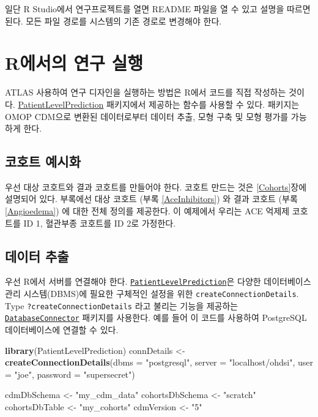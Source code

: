 \documentclass[11pt]{book}
\newenvironment{Shaded}{\begin{snugshade}}{\end{snugshade}}
\newcommand{\KeywordTok}[1]{\textcolor[rgb]{0.13,0.29,0.53}{\textbf{#1}}}
\newcommand{\DataTypeTok}[1]{\textcolor[rgb]{0.13,0.29,0.53}{#1}}
\newcommand{\StringTok}[1]{\textcolor[rgb]{0.31,0.60,0.02}{#1}}
\newcommand{\NormalTok}[1]{#1}
\theoremstyle{definition}
\theoremstyle{definition}
\theoremstyle{definition}
\theoremstyle{remark}
\begin{document}
일단 R Studio에서 연구프로젝트를 열면 README 파일을 열 수 있고 설명을
따르면 된다. 모든 파일 경로를 시스템의 기존 경로로 변경해야 한다.

\section{R에서의 연구 실행}\label{r--}

ATLAS 사용하여 연구 디자인을 실행하는 방법은 R에서 코드를 직접 작성하는
것이다.
\href{https://ohdsi.github.io/PatientLevelPrediction/}{PatientLevelPrediction}
패키지에서 제공하는 함수를 사용할 수 있다. 패키지는 OMOP CDM으로 변환된
데이터로부터 데이터 추출, 모형 구축 및 모형 평가를 가능하게 한다.

\subsection{코호트 예시화}\label{-}

우선 대상 코호트와 결과 코호트를 만들어야 한다. 코호트 만드는 것은
\ref{Cohorts}장에 설명되어 있다. 부록에선 대상 코호트 (부록
\ref{AceInhibitors}) 와 결과 코호트 (부록 \ref{Angioedema}) 에 대한 전체
정의를 제공한다. 이 예제에서 우리는 ACE 억제제 코호트를 ID 1, 혈관부종
코호트를 ID 2로 가정한다.

\subsection{데이터 추출}\label{--2}

우선 R에서 서버를 연결해야 한다.
\href{https://ohdsi.github.io/PatientLevelPrediction/}{\texttt{PatientLevelPrediction}}은
다양한 데이터베이스 관리 시스템(DBMS)에 필요한 구체적인 설정을 위한
\texttt{createConnectionDetails}. Type \texttt{?createConnectionDetails}
라고 불리는 기능을 제공하는
\href{https://ohdsi.github.io/DatabaseConnector/}{\texttt{DatabaseConnector}}
패키지를 사용한다. 예를 들어 이 코드를 사용하여 PostgreSQL
데이터베이스에 연결할 수 있다.

\begin{Shaded}
\begin{Highlighting}[]
\KeywordTok{library}\NormalTok{(PatientLevelPrediction)}
\NormalTok{connDetails <-}\StringTok{ }\KeywordTok{createConnectionDetails}\NormalTok{(}\DataTypeTok{dbms =} \StringTok{"postgresql"}\NormalTok{,}
                                       \DataTypeTok{server =} \StringTok{"localhost/ohdsi"}\NormalTok{,}
                                       \DataTypeTok{user =} \StringTok{"joe"}\NormalTok{,}
                                       \DataTypeTok{password =} \StringTok{"supersecret"}\NormalTok{)}

\NormalTok{cdmDbSchema <-}\StringTok{ "my_cdm_data"}
\NormalTok{cohortsDbSchema <-}\StringTok{ "scratch"}
\NormalTok{cohortsDbTable <-}\StringTok{ "my_cohorts"}
\NormalTok{cdmVersion <-}\StringTok{ "5"}
\end{Highlighting}
\end{Shaded}
\end{document}
